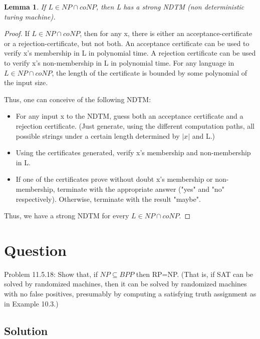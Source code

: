\documentclass[10pt]{amsart}
\newtheorem{lem}[thm]{Lemma}
\theoremstyle{remark}
\begin{document}
\begin{lem}
If $L \in NP \cap coNP$, then L has a strong NDTM (non deterministic turing machine).
\end{lem}
\begin{proof}
If $L \in NP \cap coNP$, then for any x, there is either an acceptance-certificate or a rejection-certificate, but not both. An acceptance certificate can be used to verify x's membership in L in polynomial time. A rejection certificate can be used to verify x's non-membership in L in polynomial time. For any language in $L \in NP \cap coNP$, the length of the certificate is bounded by some polynomial of the input size.

Thus, one can conceive of the following NDTM:
\begin{itemize}
\item For any input x to the NDTM, guess both an acceptance certificate and a rejection certificate. (Just generate, using the different computation paths, all possible strings under a certain length determined by $|x|$ and L.)
\item Using the certificates generated, verify x's membership and non-membership in L.
\item If one of the certificates prove without doubt x's membership or non-membership, terminate with the appropriate answer ("yes" and "no" respectively). Otherwise, terminate with the result "maybe".
\end{itemize}

Thus, we have a strong NDTM for every $L \in NP \cap coNP$.
\end{proof}

\section{Question}
Problem 11.5.18: Show that, if $NP\subseteq BPP$ then RP=NP. (That is, if SAT can be solved by randomized machines, then it can be solved by randomized machines with no false positives, presumably by computing a satisfying truth assignment as in Example 10.3.)

\subsection{Solution}
\end{document}
